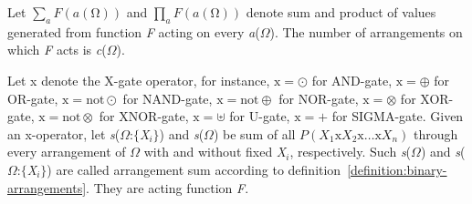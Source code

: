 \documentclass{article}
\numberwithin{equation}{section}
\numberwithin{figure}{section}
\numberwithin{table}{section}
\begin{document}
Let $\sum_a{F\left(a\left(\mathrm{\Omega }\right)\right)}$ and $\prod_a{F\left(a\left(\mathrm{\Omega }\right)\right)}$ denote sum and product of values generated from function \textit{F} acting on every \textit{a}($\Omega$). The number of arrangements on which \textit{F} acts is \textit{c}($\Omega$).

Let x denote the X-gate operator, for instance, $\mathrm{x}=\odot $ for AND-gate, $\mathrm{x}=\oplus $ for OR-gate, $\mathrm{x}=\mathrm{not}\odot $ for NAND-gate, $\mathrm{x}=\mathrm{not}\oplus $ for NOR-gate, $\mathrm{x}=\otimes $ for XOR-gate, $\mathrm{x}=\mathrm{not}\otimes $ for XNOR-gate, $\mathrm{x}=\uplus $ for U-gate, $\mathrm{x}=+$ for SIGMA-gate. Given an x-operator, let \textit{s}($\Omega$:$\{$\textit{X${}_{i}$}$\}$) and \textit{s}($\Omega$) be sum of all $P\left(X_1\mathrm{x}X_2\mathrm{x}\dots \mathrm{x}X_n\right)$ through every arrangement of $\Omega$ with and without fixed \textit{X${}_{i}$}, respectively. Such \textit{s}($\Omega$) and \textit{s}($\Omega$:$\{$\textit{X${}_{i}$}$\}$) are called arrangement sum according to definition~\ref{definition:binary-arrangements}. They are acting function \textit{F}.
\end{document}
